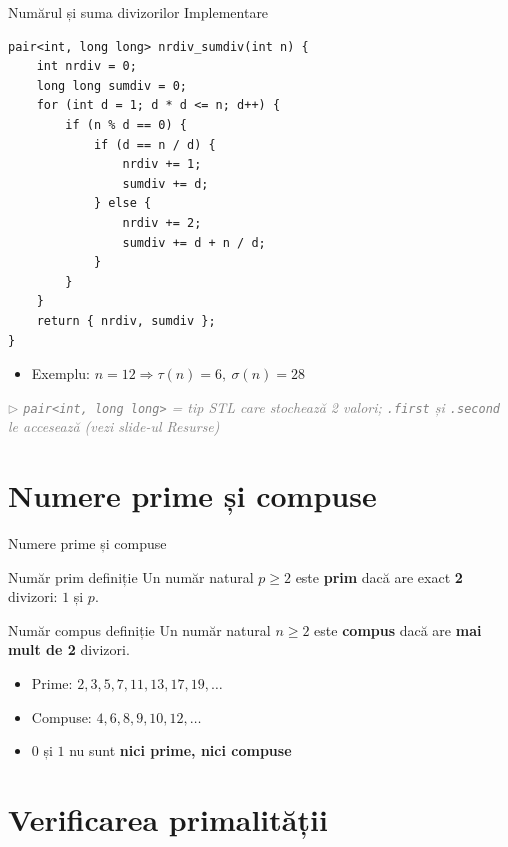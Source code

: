 \documentclass{beamer}
\newcommand{\beginnote}[1]{%
  \vfill
  {\footnotesize\textcolor{gray}{\textit{$\triangleright$ #1 (vezi slide-ul \emph{Resurse})}}}%
}
\begin{document}
\begin{frame}{Numărul și suma divizorilor \textemdash{} Implementare}
  \begin{lstlisting}
pair<int, long long> nrdiv_sumdiv(int n) {
    int nrdiv = 0;
    long long sumdiv = 0;
    for (int d = 1; d * d <= n; d++) {
        if (n % d == 0) {
            if (d == n / d) {
                nrdiv += 1;
                sumdiv += d;
            } else {
                nrdiv += 2;
                sumdiv += d + n / d;
            }
        }
    }
    return { nrdiv, sumdiv };
}
  \end{lstlisting}
  \begin{itemize}
    \item Exemplu: $n=12 \Rightarrow \tau(n)=6,\ \sigma(n)=28$
  \end{itemize}
  \beginnote{\lstinline|pair<int, long long>| = tip STL care stochează 2 valori; \lstinline|.first| și \lstinline|.second| le accesează}
\end{frame}

\section{Numere prime și compuse}

\begin{frame}{Numere prime și compuse}
  \bigskip
  \begin{block}{Număr prim \textemdash{} definiție}
    Un număr natural $p \geq 2$ este \textbf{prim} dacă are exact \textbf{2} divizori: $1$ și $p$.
  \end{block}
  \begin{block}{Număr compus \textemdash{} definiție}
    Un număr natural $n \geq 2$ este \textbf{compus} dacă are \textbf{mai mult de 2} divizori.
  \end{block}
  \bigskip
  \begin{itemize}
    \item Prime: $2, 3, 5, 7, 11, 13, 17, 19, \ldots$
    \item Compuse: $4, 6, 8, 9, 10, 12, \ldots$
    \item $0$ și $1$ nu sunt \textbf{nici prime, nici compuse}
  \end{itemize}
\end{frame}

\section{Verificarea primalității}
\end{document}
